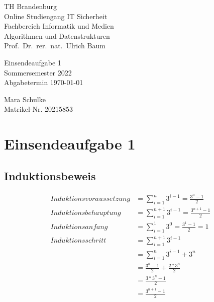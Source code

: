 \documentclass{article}
\begin{document}
\begin{titlepage}
	\begin{flushleft}
		TH Brandenburg\\
		Online Studiengang IT Sicherheit\\
		Fachbereich Informatik und Medien\\
		Algorithmen und Datenstrukturen\\
		Prof.\ Dr.\ rer.\ nat.\ Ulrich Baum
	\end{flushleft}

	\vfill

	\begin{center}
		\Large{Einsendeaufgabe 1}\\[0.5em]
		\large{Sommersemester 2022}\\[0.25em]
		\large{Abgabetermin \today}
	\end{center}

	\vfill

	\begin{flushright}
		Mara Schulke \\
		Matrikel-Nr. 20215853
	\end{flushright}
\end{titlepage}

\newpage

\section*{Einsendeaufgabe 1}

\subsection{Induktionsbeweis}

\begin{align*}
	Induktionsvoraussetzung & = \sum_{i=1}^{n}3^{i - 1} = \frac{3^n-1}{2}       \\
	Induktionsbehauptung    & = \sum_{i=1}^{n+1}3^{i - 1} = \frac{3^{n+1}-1}{2} \\
	Induktionsanfang        & = \sum_{i=1}^{1}3^0 = \frac{3^1 - 1}{2} = 1       \\
	Induktionsschritt       & = \sum_{i=1}^{n+1}3^{i - 1}                       \\
							& = \sum_{i=1}^{n}3^{i - 1} + 3^n                   \\
							& = \frac{3^n - 1}{2} + \frac{2 * 3^n}{2}           \\
							& = \frac{3 * 3^n - 1}{2}                           \\
							& = \frac{3^{n + 1} - 1}{2}                         \\
\end{align*}
\end{document}
